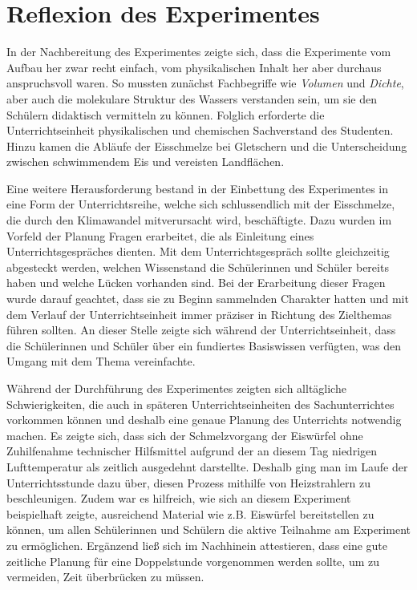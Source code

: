 \section{Reflexion des Experimentes}
In der Nachbereitung des Experimentes zeigte sich, dass die Experimente vom Aufbau her zwar recht einfach, vom physikalischen Inhalt her aber durchaus anspruchsvoll waren.
So mussten zunächst Fachbegriffe wie \emph{Volumen} und \emph{Dichte}, aber auch die molekulare Struktur des Wassers verstanden sein, um sie den Schülern didaktisch vermitteln zu können.
Folglich erforderte die Unterrichtseinheit physikalischen und chemischen Sachverstand des Studenten.
Hinzu kamen die Abläufe der Eisschmelze bei Gletschern und die Unterscheidung zwischen schwimmendem Eis und vereisten Landflächen.

Eine weitere Herausforderung bestand in der Einbettung des Experimentes in eine Form der Unterrichtsreihe, welche sich schlussendlich mit der Eisschmelze, die durch den Klimawandel mitverursacht wird, beschäftigte.
Dazu wurden im Vorfeld der Planung Fragen erarbeitet, die als Einleitung eines Unterrichtsgespräches dienten.
Mit dem Unterrichtsgespräch sollte gleichzeitig abgesteckt werden, welchen Wissenstand die Schülerinnen und Schüler bereits haben und welche Lücken vorhanden sind.
Bei der Erarbeitung dieser Fragen wurde darauf geachtet, dass sie zu Beginn sammelnden Charakter hatten und mit dem Verlauf der Unterrichtseinheit immer präziser in Richtung des Zielthemas führen sollten.
An dieser Stelle zeigte sich während der Unterrichtseinheit, dass die Schülerinnen und Schüler über ein fundiertes Basiswissen verfügten, was den Umgang mit dem Thema vereinfachte.

Während der Durchführung des Experimentes zeigten sich alltägliche Schwierigkeiten, die auch in späteren Unterrichtseinheiten des Sachunterrichtes vorkommen können und deshalb eine genaue Planung des Unterrichts notwendig machen.
Es zeigte sich, dass sich der Schmelzvorgang der Eiswürfel ohne Zuhilfenahme technischer Hilfsmittel aufgrund der an diesem Tag niedrigen Lufttemperatur als zeitlich ausgedehnt darstellte.
Deshalb ging man im Laufe der Unterrichtsstunde dazu über, diesen Prozess mithilfe von Heizstrahlern zu beschleunigen.
Zudem war es hilfreich, wie sich an diesem Experiment beispielhaft zeigte, ausreichend Material wie z.B. Eiswürfel bereitstellen zu können, um allen Schülerinnen und Schülern die aktive Teilnahme am Experiment zu ermöglichen.
Ergänzend ließ sich im Nachhinein attestieren, dass eine gute zeitliche Planung für eine Doppelstunde vorgenommen werden sollte, um zu vermeiden, Zeit überbrücken zu müssen.


